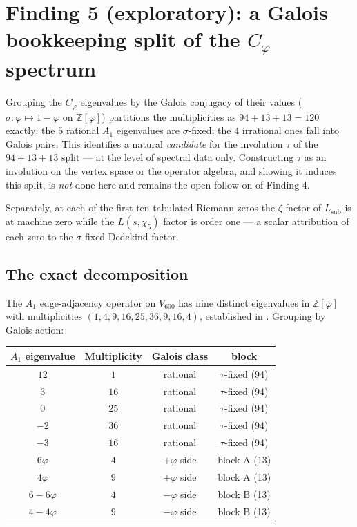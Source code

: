 \documentclass[11pt,a4paper]{article}
\newcommand{\Vsix}{V_{600}}
\newcommand{\Cphi}{C_\varphi}
\newcommand{\Z}{\mathbb{Z}}
\newcommand{\Lsub}{L_{\mathrm{sub}}}
\begin{document}
\section{Finding 5 (exploratory): a Galois bookkeeping split of
the $\Cphi$ spectrum}
\label{sec:finding5}

\begin{findingbox}[title={Finding 5 (follow-on to Finding 4, bookkeeping level)}]
Grouping the $\Cphi$ eigenvalues by the Galois conjugacy of their
values ($\sigma : \varphi \mapsto 1-\varphi$ on $\Z[\varphi]$)
partitions the multiplicities as $94 + 13 + 13 = 120$ exactly: the
$5$ rational $A_1$ eigenvalues are $\sigma$-fixed; the $4$
irrational ones fall into Galois pairs. This identifies a natural
\emph{candidate} for the involution $\tau$ of the
$94{+}13{+}13$ split --- at the level of spectral data only.
Constructing $\tau$ as an involution on the vertex space or the
operator algebra, and showing it induces this split, is \emph{not}
done here and remains the open follow-on of Finding 4.

Separately, at each of the first ten tabulated Riemann zeros the
$\zeta$ factor of $\Lsub$ is at machine zero while the
$L(s,\chi_5)$ factor is order one --- a scalar attribution of each
zero to the $\sigma$-fixed Dedekind factor.
\end{findingbox}

\subsection{The exact decomposition}

The $A_1$ edge-adjacency operator on $\Vsix$ has nine distinct
eigenvalues in $\Z[\varphi]$ with multiplicities
$(1, 4, 9, 16, 25, 36, 9, 16, 4)$, established in
\cite{icosianTriad}. Grouping by Galois action:

\begin{center}
\begin{tabular}{cccc}
\toprule
\textbf{$A_1$ eigenvalue} & \textbf{Multiplicity} &
\textbf{Galois class} & \textbf{block} \\
\midrule
$12$            & $1$  & rational    & $\tau$-fixed (94) \\
$3$             & $16$ & rational    & $\tau$-fixed (94) \\
$0$             & $25$ & rational    & $\tau$-fixed (94) \\
$-2$            & $36$ & rational    & $\tau$-fixed (94) \\
$-3$            & $16$ & rational    & $\tau$-fixed (94) \\
\midrule
$6\varphi$      & $4$  & $+\varphi$ side & block A (13) \\
$4\varphi$      & $9$  & $+\varphi$ side & block A (13) \\
\midrule
$6 - 6\varphi$  & $4$  & $-\varphi$ side & block B (13) \\
$4 - 4\varphi$  & $9$  & $-\varphi$ side & block B (13) \\
\bottomrule
\end{tabular}
\end{center}
\end{document}
